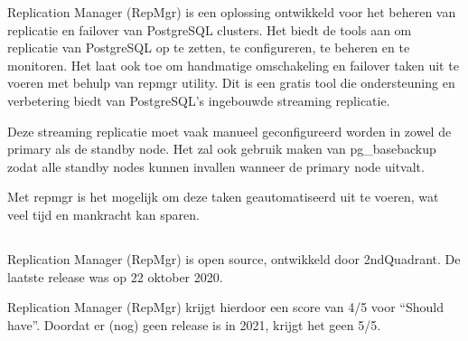 Replication Manager (RepMgr) is een oplossing ontwikkeld voor het beheren van replicatie en failover van PostgreSQL clusters. Het biedt de tools aan om replicatie van PostgreSQL op te zetten, te configureren, te beheren en te monitoren. Het laat ook toe om handmatige omschakeling en failover taken uit te voeren met behulp van repmgr utility. Dit is een gratis tool die ondersteuning en verbetering biedt van PostgreSQL's ingebouwde streaming replicatie.

Deze streaming replicatie moet vaak manueel geconfigureerd worden in zowel de primary als de standby node. Het zal ook gebruik maken van pg\_basebackup zodat alle standby nodes kunnen invallen wanneer de primary node uitvalt.

Met repmgr is het mogelijk om deze taken geautomatiseerd uit te voeren, wat veel tijd en mankracht kan sparen.

\subsubsection{}
\label{subsubsec:Failover}




\subsubsection{}
\label{subsubsec:Monitoring}

\subsection{}
\label{subsec:Should have}

Replication Manager (RepMgr) is open source, ontwikkeld door 2ndQuadrant.
De laatste release was op 22 oktober 2020.

Replication Manager (RepMgr) krijgt hierdoor een score van 4/5 voor “Should have”. Doordat er (nog) geen release is in 2021, krijgt het geen 5/5.

\subsubsection{}
\label{subsubsec:Actieve ondersteuning in 2020-2021}


